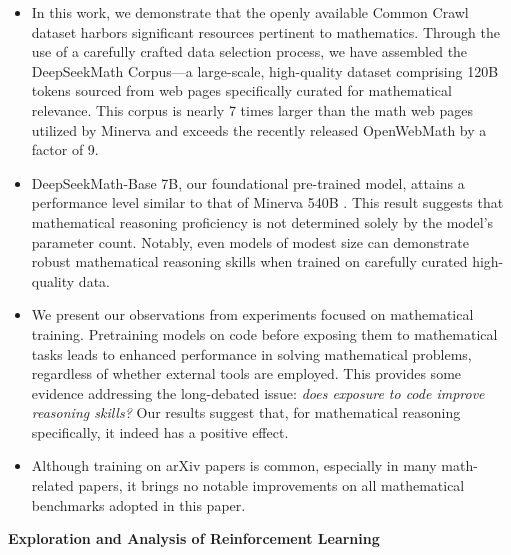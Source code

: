 \begin{itemize}[topsep=0pt]
    \item In this work, we demonstrate that the openly available Common Crawl dataset harbors significant resources pertinent to mathematics. Through the use of a carefully crafted data selection process, we have assembled the DeepSeekMath Corpus—a large-scale, high-quality dataset comprising 120B tokens sourced from web pages specifically curated for mathematical relevance. This corpus is nearly 7 times larger than the math web pages utilized by Minerva \citep{minerva} and exceeds the recently released OpenWebMath \citep{openwebmath} by a factor of 9.

\item DeepSeekMath-Base 7B, our foundational pre-trained model, attains a performance level similar to that of Minerva 540B \citep{minerva}. This result suggests that mathematical reasoning proficiency is not determined solely by the model's parameter count. Notably, even models of modest size can demonstrate robust mathematical reasoning skills when trained on carefully curated high-quality data.

\item We present our observations from experiments focused on mathematical training. Pretraining models on code before exposing them to mathematical tasks leads to enhanced performance in solving mathematical problems, regardless of whether external tools are employed. This provides some evidence addressing the long-debated issue: \textit{does exposure to code improve reasoning skills?} Our results suggest that, for mathematical reasoning specifically, it indeed has a positive effect.

    \item Although training on arXiv papers is common, especially in many math-related papers, it brings no notable improvements on all mathematical benchmarks adopted in this paper.
\end{itemize}

\textbf{Exploration and Analysis of Reinforcement Learning}

